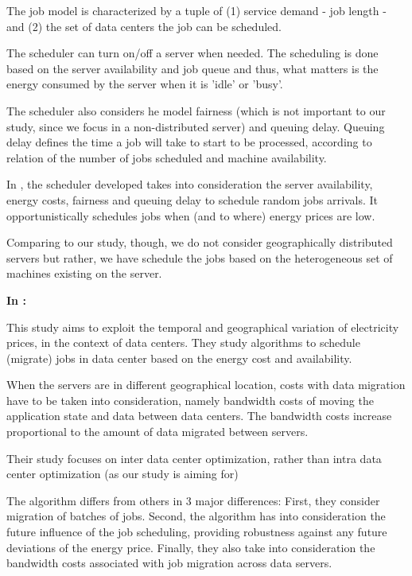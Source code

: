 The job model is characterized by a tuple of (1) service demand - job length -
and (2) the set of data centers the job can be scheduled. 

The scheduler can turn on/off a server when needed. The scheduling is done based
on the server availability and job queue and thus, what matters is the energy
consumed by the server when it is 'idle' or 'busy'.

The scheduler also considers he model fairness (which is not important to
our study, since we focus in a non-distributed server) and queuing delay.
Queuing delay defines the time a job will take to start to be processed,
according to relation of the number of jobs scheduled and machine availability.

In \cite{EFF_JOB_SCHEDULING}, the scheduler developed takes into consideration
the server availability, energy costs, fairness and queuing delay to schedule
random jobs arrivals. It opportunistically schedules jobs when (and to where) 
energy prices are low.

Comparing to our study, though, we do not consider geographically distributed 
servers but rather, we have schedule the jobs based on the heterogeneous set of 
machines existing on the server.



\textbf{In \cite{MIGRATION_CLOUD}:}

This study aims to exploit the temporal and geographical variation of
electricity prices, in the context of data centers. They study algorithms to
schedule (migrate) jobs in data center based on the energy cost and
availability.

When the servers are in different geographical location, costs with data
migration have to be taken into consideration, namely bandwidth costs of moving
the application state and data between data centers. The bandwidth costs
increase proportional to the amount of data migrated between servers.

Their study focuses on inter data center optimization, rather than intra data
center optimization (as our study is aiming for)

The algorithm differs from others in 3 major differences: First, they consider
migration of batches of jobs. Second, the algorithm has into consideration the
future influence of the job scheduling, providing robustness against any future
deviations of the energy price. Finally, they also take into consideration the 
bandwidth costs associated with job migration across data servers.

